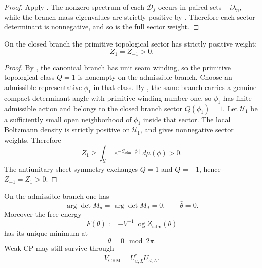 \begin{proof}
Apply . The nonzero spectrum of each $\mathcal D_f$ occurs in
paired sets $\pm i\lambda_n$, while the branch mass eigenvalues are strictly positive by
. Therefore each sector determinant is nonnegative, and so is the
full sector weight.
\end{proof}

\begin{lemma}
\label{lem:nontrivial-topological-support}
On the closed branch the primitive topological sector has strictly positive weight:
\[
Z_1=Z_{-1}>0.
\]
\end{lemma}

\begin{proof}
By , the canonical branch has unit seam winding, so the primitive
topological class $Q=1$ is nonempty on the admissible branch. Choose an admissible representative
$\phi_1$ in that class. By , the same branch carries a genuine compact
determinant angle with primitive winding number one, so $\phi_1$ has finite admissible action and
belongs to the closed branch sector $Q(\phi_1)=1$. Let $\mathcal U_1$ be a sufficiently small open
neighborhood of $\phi_1$ inside that sector. The local Boltzmann density is strictly positive on
$\mathcal U_1$, and  gives nonnegative sector weights.
Therefore
\[
Z_1
\ge
\int_{\mathcal U_1} e^{-S_{\mathrm{adm}}[\phi]}\,d\mu(\phi)
>
0.
\]
The antiunitary sheet symmetry exchanges $Q=1$ and $Q=-1$, hence $Z_{-1}=Z_1>0$.
\end{proof}

\begin{theorem}
\label{thm:strong-cp-closure}
\label{thm:strong-cp-closure-positive}
On the admissible branch one has
\[
\arg\det M_u=\arg\det M_d=0,
\qquad
\bar\theta=0.
\]
Moreover the free energy
\[
F(\theta):=-V^{-1}\log Z_{\mathrm{adm}}(\theta)
\]
has its unique minimum at
\[
\theta=0\!\!\mod 2\pi.
\]
Weak CP may still survive through
\[
V_{\mathrm{CKM}}=U_{u,L}^\dagger U_{d,L}.
\]
\end{theorem}

